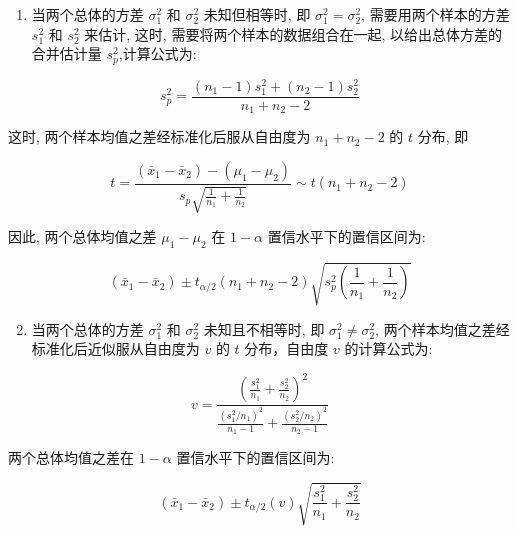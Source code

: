 \documentclass[10pt]{article}
\begin{document}
\begin{CJK*}{UTF8}{bsmi}
\begin{enumerate}
  \item 当两个总体的方差 $\sigma_{1}^{2}$ 和 $\sigma_{2}^{2}$ 未知但相等时, 即 $\sigma_{1}^{2}=\sigma_{2}^{2}$, 需要用两个样本的方差 $s_{1}^{2}$ 和 $s_{2}^{2}$ 来估计, 这时, 需要将两个样本的数据组合在一起, 以给出总体方差的合并估计量 $s_{p}^{2}$,计算公式为:
\end{enumerate}


\begin{equation*}
s_{p}^{2}=\frac{\left(n_{1}-1\right) s_{1}^{2}+\left(n_{2}-1\right) s_{2}^{2}}{n_{1}+n_{2}-2} \tag{7.15}
\end{equation*}


这时, 两个样本均值之差经标准化后服从自由度为 $n_{1}+n_{2}-2$ 的 $t$ 分布, 即


\begin{equation*}
t=\frac{\left(\bar{x}_{1}-\bar{x}_{2}\right)-\left(\mu_{1}-\mu_{2}\right)}{s_{p} \sqrt{\frac{1}{n_{1}}+\frac{1}{n_{2}}}} \sim t\left(n_{1}+n_{2}-2\right) \tag{7.16}
\end{equation*}


因此, 两个总体均值之差 $\mu_{1}-\mu_{2}$ 在 $1-\alpha$ 置信水平下的置信区间为:


\begin{equation*}
\left(\bar{x}_{1}-\bar{x}_{2}\right) \pm t_{\alpha / 2}\left(n_{1}+n_{2}-2\right) \sqrt{s_{p}^{2}\left(\frac{1}{n_{1}}+\frac{1}{n_{2}}\right)} \tag{7.17}
\end{equation*}


\begin{enumerate}
  \setcounter{enumi}{1}
  \item 当两个总体的方差 $\sigma_{1}^{2}$ 和 $\sigma_{2}^{2}$ 未知且不相等时, 即 $\sigma_{1}^{2} \neq \sigma_{2}^{2}$, 两个样本均值之差经标准化后近似服从自由度为 $v$ 的 $t$ 分布，自由度 $v$ 的计算公式为:
\end{enumerate}


\begin{equation*}
v=\frac{\left(\frac{s_{1}^{2}}{n_{1}}+\frac{s_{2}^{2}}{n_{2}}\right)^{2}}{\frac{\left(s_{1}^{2} / n_{1}\right)^{2}}{n_{1}-1}+\frac{\left(s_{2}^{2} / n_{2}\right)^{2}}{n_{2}-1}} \tag{7.18}
\end{equation*}


两个总体均值之差在 $1-\alpha$ 置信水平下的置信区间为:


\begin{equation*}
\left(\bar{x}_{1}-\bar{x}_{2}\right) \pm t_{\alpha / 2}(v) \sqrt{\frac{s_{1}^{2}}{n_{1}}+\frac{s_{2}^{2}}{n_{2}}} \tag{7.19}
\end{equation*}



\end{CJK*}
\end{document}
